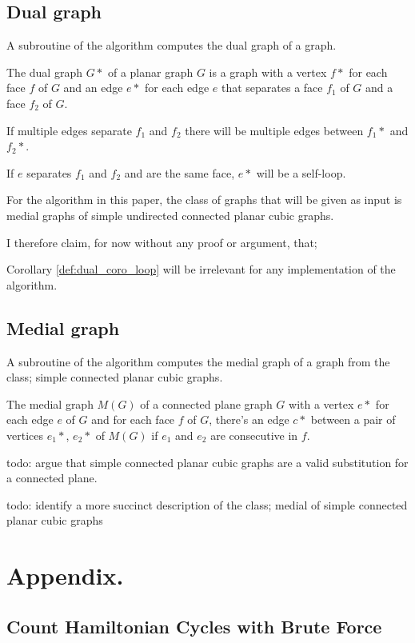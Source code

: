 \documentclass{article}
\begin{document}
	\subsection{Dual graph}

		A subroutine of the algorithm computes the dual graph of a graph.
		
		\begin{definition}
			The dual graph $G*$ of a planar graph $G$ is a graph with a vertex $f*$ for each face $f$ of $G$ and an edge $e*$ for each edge $e$ that separates a face $f_1$ of $G$ and a face $f_2$ of $G$.
		\end{definition}
		
		\begin{corollary}
			If multiple edges separate $f_1$ and $f_2$ there will be multiple edges between $f_1*$ and $f_2*$.
		\end{corollary}
		
		\begin{corollary}\label{def:dual_coro_loop}
			If $e$ separates $f_1$ and $f_2$ and are the same face, $e*$ will be a self-loop.
		\end{corollary}
		
		For the algorithm in this paper, the class of graphs that will be given as input is medial graphs of simple undirected connected planar cubic graphs.
		
		I therefore claim, for now without any proof or argument, that; 
		
		\begin{claim}
			Corollary \ref{def:dual_coro_loop} will be irrelevant for any implementation of the algorithm.
		\end{claim}

	\subsection{Medial graph}
		
		A subroutine of the algorithm computes the medial graph of a graph from the class; simple connected planar cubic graphs.
		
		\begin{definition}
			The medial graph $M(G)$ of a connected plane graph $G$ with a vertex $e*$ for each edge $e$ of $G$ and for each face $f$ of $G$, there's an edge $c*$ between a pair of vertices $e_1*$, $e_2*$ of $M(G)$ if $e_1$ and $e_2$ are consecutive in $f$.
		\end{definition}
		
		todo: argue that simple connected planar cubic graphs are a valid substitution for a connected plane.
		
		todo: identify a more succinct description of the class; medial of simple connected planar cubic graphs
		
\section{Appendix.}

\subsection{Count Hamiltonian Cycles with Brute Force}
\label{appx:count-hamcyc-brute-force}
\end{document}
